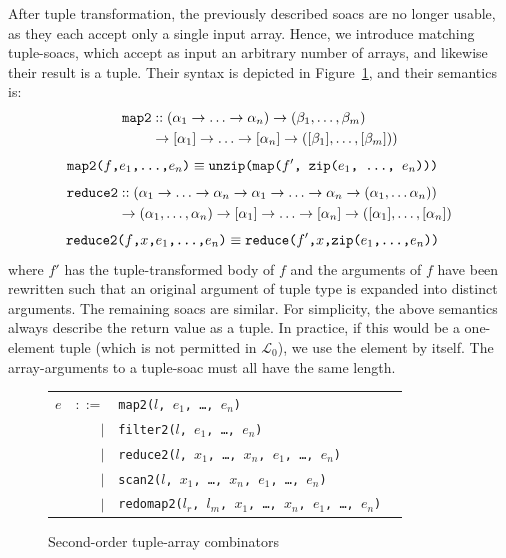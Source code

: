 \documentclass{sigplanconf}  %
\newcommand{\LO}{$\mathcal{L}_0$}
\begin{document}
After tuple transformation, the previously described {\sc soac}s are
no longer usable, as they each accept only a single input array.
Hence, we introduce matching tuple-{\sc soac}s, which accept as input
an arbitrary number of arrays, and likewise their result is
a tuple.
Their syntax is depicted in Figure~\ref{fig:tuple-soacs}, 
and their semantics is: %
\begin{align*}
  \text{\tt map2} &:: (\alpha_{1}\rightarrow\ldots\rightarrow\alpha_{n})\rightarrow(\beta_{1},\ldots,\beta_{m})\\
&\rightarrow[\alpha_{1}]\rightarrow\ldots\rightarrow[\alpha_{n}]\rightarrow([\beta_{1}],\ldots,[\beta_{m}]))
\end{align*}
\begin{align*}
  \text{\tt map2($f$,$e_{1}$,\ldots,$e_{n}$)} & \equiv \text{\tt unzip(map($f'$, zip($e_{1}$, \ldots, $e_{n}$)))}
\end{align*}
\begin{align*}
  \text{\tt reduce2} &::(\alpha_{1}\rightarrow\ldots\rightarrow\alpha_{n}\rightarrow\alpha_{1}\rightarrow\ldots\rightarrow\alpha_{n}\rightarrow(\alpha_{1},\ldots\alpha_{n}))\\
& \rightarrow(\alpha_{1},\ldots,\alpha_{n})\rightarrow[\alpha_{1}]\rightarrow\ldots\rightarrow[\alpha_{n}]\rightarrow([\alpha_{1}],\ldots,[\alpha_{n}])
\end{align*}
\begin{align*}
  \text{\tt reduce2($f$,$x$,$e_{1}$,\ldots,$e_{n}$)} &\equiv \text{\tt reduce($f'$,$x$,zip($e_{1}$,\ldots,$e_{n}$))}
\end{align*}
\noindent where $f'$ has the tuple-transformed body of $f$ and the arguments
of $f$ have been rewritten such that an original argument of tuple type is
expanded into distinct arguments.
The remaining {\sc soac}s are similar.    For simplicity, the
above semantics always describe the return value as a tuple.  In
practice, if this would be a one-element tuple (which is not permitted
in \LO), we use the element by itself.  The array-arguments to a
tuple-{\sc soac} must all have the same length.

\begin{figure}[bt]
\begin{tabular}{lrll}
$e$ & $::=$ & {\tt map2($l$, $e_{1}$, \ldots, $e_{n}$)} \\
    & $|$ & {\tt filter2($l$, $e_{1}$, \ldots, $e_{n}$)} \\
    & $|$ & {\tt reduce2($l$, $x_{1}$, \ldots, $x_{n}$, $e_{1}$, \ldots, $e_{n}$)} \\
    & $|$ & {\tt scan2($l$, $x_{1}$, \ldots, $x_{n}$, $e_{1}$, \ldots, $e_{n}$)} \\
    & $|$ & {\tt redomap2($l_{r}$, $l_{m}$, $x_{1}$, \ldots, $x_{n}$, $e_{1}$, \ldots, $e_{n}$)} \\
\end{tabular}
\caption{Second-order tuple-array combinators}
\label{fig:tuple-soacs}
\end{figure}
\end{document}
